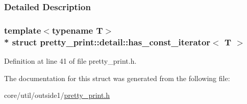 \subsubsection{Detailed Description}
\subsubsection*{template$<$typename T$>$\\*
struct pretty\+\_\+print\+::detail\+::has\+\_\+const\+\_\+iterator$<$ T $>$}



Definition at line 41 of file pretty\+\_\+print.\+h.



The documentation for this struct was generated from the following file\+:\begin{DoxyCompactItemize}
\item 
core/util/outside1/\hyperlink{pretty__print_8h}{pretty\+\_\+print.\+h}\end{DoxyCompactItemize}
